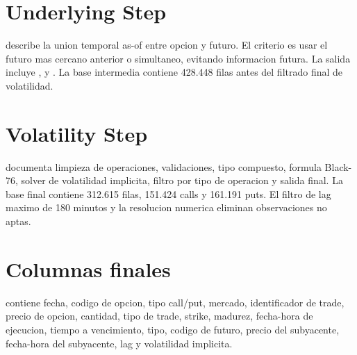 \section{Underlying Step}

 describe la union temporal as-of entre opcion y futuro. El criterio es usar el futuro mas cercano anterior o simultaneo, evitando informacion futura. La salida incluye ,  y . La base intermedia contiene 428.448 filas antes del filtrado final de volatilidad.

\section{Volatility Step}

 documenta limpieza de operaciones, validaciones, tipo compuesto, formula Black-76, solver de volatilidad implicita, filtro por tipo de operacion y salida final. La base final contiene 312.615 filas, 151.424 calls y 161.191 puts. El filtro de lag maximo de 180 minutos y la resolucion numerica eliminan observaciones no aptas.

\section{Columnas finales}

 contiene fecha, codigo de opcion, tipo call/put, mercado, identificador de trade, precio de opcion, cantidad, tipo de trade, strike, madurez, fecha-hora de ejecucion, tiempo a vencimiento, tipo, codigo de futuro, precio del subyacente, fecha-hora del subyacente, lag y volatilidad implicita.
